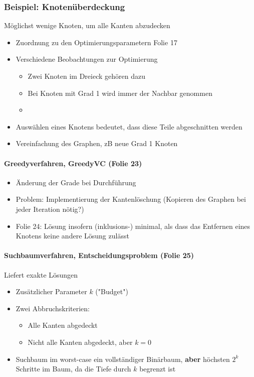 \documentclass[a4paper,11pt]{article}
\begin{document}
\subsubsection*{Beispiel: Knotenüberdeckung}
Möglichst wenige Knoten, um alle Kanten abzudecken
\begin{itemize}
  \item Zuordnung zu den Optimierungsparametern Folie 17
  \item Verschiedene Beobachtungen zur Optimierung
  \begin{itemize}
    \item Zwei Knoten im Dreieck gehören dazu
    \item Bei Knoten mit Grad 1 wird immer der Nachbar genommen
    \item 
  \end{itemize}
  \item Auswählen eines Knotens bedeutet, dass diese Teile abgeschnitten werden
  \item \Rightarrow Vereinfachung des Graphen, zB neue Grad 1 Knoten
\end{itemize}

\paragraph*{Greedyverfahren, GreedyVC (Folie 23)}
\begin{itemize}
  \item Änderung der Grade bei Durchführung
  \item Problem: Implementierung der Kantenlöschung (Kopieren des Graphen bei jeder Iteration nötig?)
  \item Folie 24: Lösung insofern (inklusions-) minimal, als dass das Entfernen eines Knotens keine andere Lösung zulässt
\end{itemize}

\paragraph*{Suchbaumverfahren, Entscheidungsproblem (Folie 25)}
Liefert exakte Lösungen
\begin{itemize}
  \item Zusätzlicher Parameter $ k $ ("Budget")
  \item Zwei Abbruchskriterien:
  \begin{itemize}
    \item Alle Kanten abgedeckt
    \item Nicht alle Kanten abgedeckt, aber $ k=0 $
  \end{itemize}
  \item Suchbaum im worst-case ein vollständiger Binärbaum, \textbf{aber} höchsten $ 2^{k} $ Schritte im Baum, da die Tiefe durch $ k $ begrenzt ist
\end{itemize}
\end{document}
